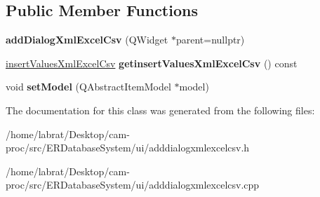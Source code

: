 \subsection*{Public Member Functions}
\begin{DoxyCompactItemize}
\item 
{\bfseries add\+Dialog\+Xml\+Excel\+Csv} (Q\+Widget $\ast$parent=nullptr)\hypertarget{classaddDialogXmlExcelCsv_a47b3e548f9b75e2b1a7ba0ce38728d34}{}\label{classaddDialogXmlExcelCsv_a47b3e548f9b75e2b1a7ba0ce38728d34}

\item 
\hyperlink{classinsertValuesXmlExcelCsv}{insert\+Values\+Xml\+Excel\+Csv} {\bfseries getinsert\+Values\+Xml\+Excel\+Csv} () const \hypertarget{classaddDialogXmlExcelCsv_a2e04de20e93fe34c65430aab248b9614}{}\label{classaddDialogXmlExcelCsv_a2e04de20e93fe34c65430aab248b9614}

\item 
void {\bfseries set\+Model} (Q\+Abstract\+Item\+Model $\ast$model)\hypertarget{classaddDialogXmlExcelCsv_a179cd39836d5eb09a6c52a65490f8184}{}\label{classaddDialogXmlExcelCsv_a179cd39836d5eb09a6c52a65490f8184}

\end{DoxyCompactItemize}


The documentation for this class was generated from the following files\+:\begin{DoxyCompactItemize}
\item 
/home/labrat/\+Desktop/cam-\/proc/src/\+E\+R\+Database\+System/ui/adddialogxmlexcelcsv.\+h\item 
/home/labrat/\+Desktop/cam-\/proc/src/\+E\+R\+Database\+System/ui/adddialogxmlexcelcsv.\+cpp\end{DoxyCompactItemize}
